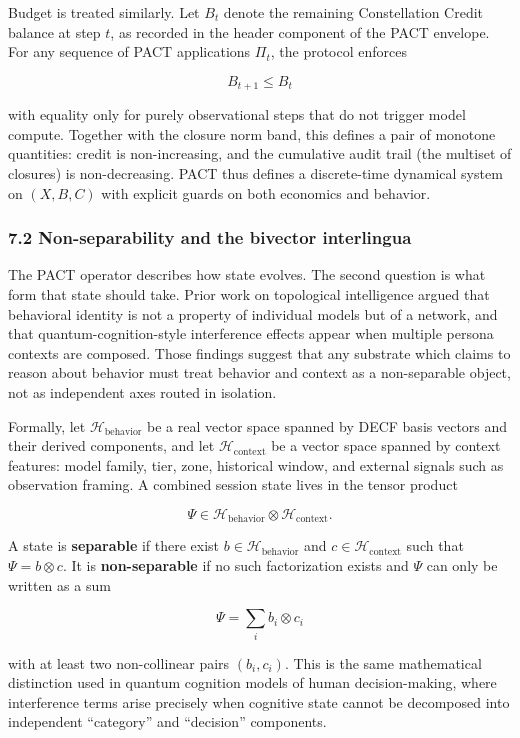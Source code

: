 Budget is treated similarly. Let \(B_t\) denote the remaining
Constellation Credit balance at step \(t\), as recorded in the header
component of the PACT envelope. For any sequence of PACT applications
\(\Pi_t\), the protocol enforces

\[
B_{t+1} \le B_t
\]

with equality only for purely observational steps that do not trigger
model compute. Together with the closure norm band, this defines a pair
of monotone quantities: credit is non-increasing, and the cumulative
audit trail (the multiset of closures) is non-decreasing. PACT thus
defines a discrete-time dynamical system on \((X, B, C)\) with explicit
guards on both economics and behavior.

\subsubsection{7.2 Non-separability and the bivector
interlingua}\label{non-separability-and-the-bivector-interlingua}

The PACT operator describes how state evolves. The second question is
what form that state should take. Prior work on topological intelligence
argued that behavioral identity is not a property of individual models
but of a network, and that quantum-cognition-style interference effects
appear when multiple persona contexts are composed. Those findings
suggest that any substrate which claims to reason about behavior must
treat behavior and context as a non-separable object, not as independent
axes routed in isolation.

Formally, let \(\mathcal{H}_{\text{behavior}}\) be a real vector space
spanned by DECF basis vectors and their derived components, and let
\(\mathcal{H}_{\text{context}}\) be a vector space spanned by context
features: model family, tier, zone, historical window, and external
signals such as observation framing. A combined session state lives in
the tensor product

\[
\Psi \in \mathcal{H}_{\text{behavior}} \otimes \mathcal{H}_{\text{context}}.
\]

A state is \textbf{separable} if there exist
\(b \in \mathcal{H}_{\text{behavior}}\) and
\(c \in \mathcal{H}_{\text{context}}\) such that \(\Psi = b \otimes c\).
It is \textbf{non-separable} if no such factorization exists and
\(\Psi\) can only be written as a sum

\[
\Psi = \sum_{i} b_i \otimes c_i
\]

with at least two non-collinear pairs \((b_i, c_i)\). This is the same
mathematical distinction used in quantum cognition models of human
decision-making, where interference terms arise precisely when cognitive
state cannot be decomposed into independent ``category'' and
``decision'' components.

